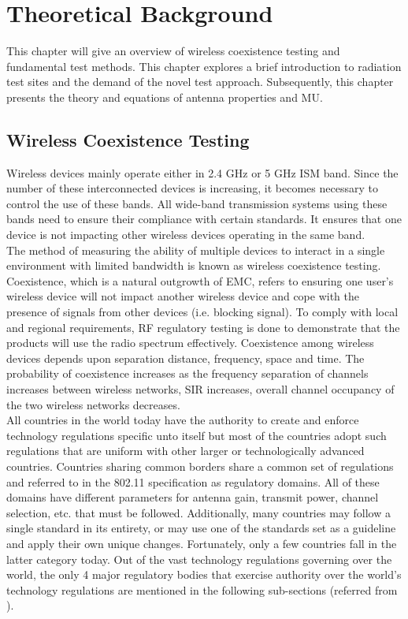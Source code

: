 \chapter{Theoretical Background}\label{chap:theorie}

This chapter will give an overview of wireless coexistence testing and fundamental test methods. This chapter explores a brief introduction to radiation test sites and the demand of the novel test approach. Subsequently,
this chapter presents the theory and equations of antenna properties and \acf{MU}.

\section{ Wireless Coexistence Testing  } 
Wireless devices mainly operate either in 2.4 GHz or 5 GHz \acf{ISM} band. Since the number of these interconnected devices is increasing, it becomes necessary to control the use of these bands. All wide-band transmission systems using these bands need to ensure their compliance with certain standards.  It ensures that one device is not impacting other wireless devices operating in the same band. \\

The method of measuring the ability of multiple devices to interact in a single environment with limited bandwidth is known as wireless coexistence testing. Coexistence, which is a natural outgrowth of \acf{EMC}, refers to ensuring one user's wireless device will not impact another wireless device and cope with the presence of signals from other devices (i.e. blocking signal). To comply with local and regional requirements, \acs{RF} regulatory testing is done to demonstrate that the products will use the radio spectrum effectively. Coexistence among wireless devices depends upon separation distance, frequency, space and time. The probability of coexistence increases as the frequency separation of channels increases between wireless networks, \acf{SIR} increases, overall channel occupancy of the two wireless networks decreases. \\

All countries in the world today have the authority to create and enforce technology regulations specific unto itself but most of the countries adopt such regulations that are uniform with other larger or technologically advanced countries. Countries sharing common borders share a common set of regulations and referred to in the 802.11 specification as regulatory domains. All of these domains have different parameters for antenna gain, transmit power, channel selection, etc. that must be followed. Additionally, many countries may follow a single standard in its entirety, or may use one of the standards set as a guideline and apply their own unique changes. Fortunately, only a few countries fall in the latter category today. Out of the vast technology regulations governing over the world, the only 4 major regulatory bodies that exercise authority over the world's technology regulations are mentioned in the following sub-sections (referred from \cite{ppr_2020}).

